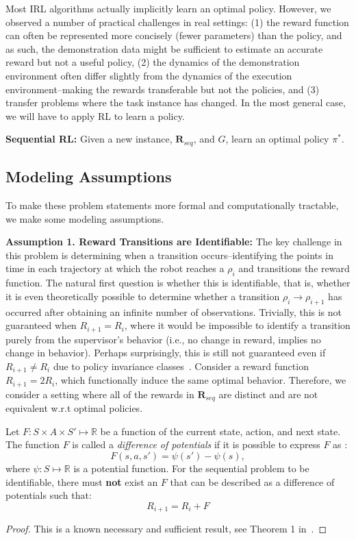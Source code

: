 \vspace{0.25em}

Most IRL algorithms actually implicitly learn an optimal policy. However, we observed a number of practical challenges in real settings: (1) the reward function can often be represented more concisely (fewer parameters) than the policy, and as such, the demonstration data might be sufficient to estimate an accurate reward but not a useful policy, (2) the dynamics of the demonstration environment often differ slightly from the dynamics of the execution environment--making the rewards transferable but not the policies, and (3) transfer problems where the task instance has changed. 
In the most general case, we will have to apply RL to learn a policy.

\vspace{0.25em} \noindent \textbf{Sequential RL: } Given a new instance, $\mathbf{R}_{seq}$, and $G$, learn an optimal policy $\pi^*$.


\subsection{Modeling Assumptions}
To make these problem statements more formal and computationally tractable, we make some modeling assumptions.

\vspace{0.5em}\noindent\textbf{Assumption 1. Reward Transitions are Identifiable: } The key challenge in this problem is determining when a transition occurs--identifying the points in time in each trajectory at which the robot reaches a $\rho_i$ and transitions the reward function. The natural first question is whether this is identifiable, that is, whether it is even theoretically possible to determine whether a transition $\rho_i \rightarrow \rho_{i+1}$ has occurred after obtaining an infinite number of observations. Trivially, this is not guaranteed when $R_{i+1} = R_{i}$, where it would be impossible to identify a transition purely from the supervisor's behavior (i.e., no change in reward, implies no change in behavior). Perhaps surprisingly, this is still not guaranteed even if $R_{i+1} \ne R_{i}$ due to policy invariance classes~\cite{DBLP:conf/icml/NgHR99}. Consider a reward function $R_{i+1} = 2R_{i}$, which functionally induce the same optimal behavior. Therefore, we consider a setting where all of the rewards in $\mathbf{R}_{seq}$ are distinct and are not equivalent w.r.t optimal policies.

\begin{proposition}
Let $F: S \times A \times S' \mapsto \mathbb{R}$ be a function of the current state, action, and next state. The function $F$ is called a \emph{difference of potentials} if it is possible to express $F$ as :
\[
F(s,a,s') = \psi(s') - \psi(s),
\]
where $\psi: S \mapsto \mathbb{R}$ is a potential function.
For the sequential problem to be identifiable, there must \textbf{not} exist an $F$ that can be described as a difference of potentials such that: 
\[ 
R_{i+1} = R_{i} + F
\]
\end{proposition}
\begin{proof}
This is a known necessary and sufficient result, see Theorem 1 in~\cite{DBLP:conf/icml/NgHR99}.
\end{proof}

